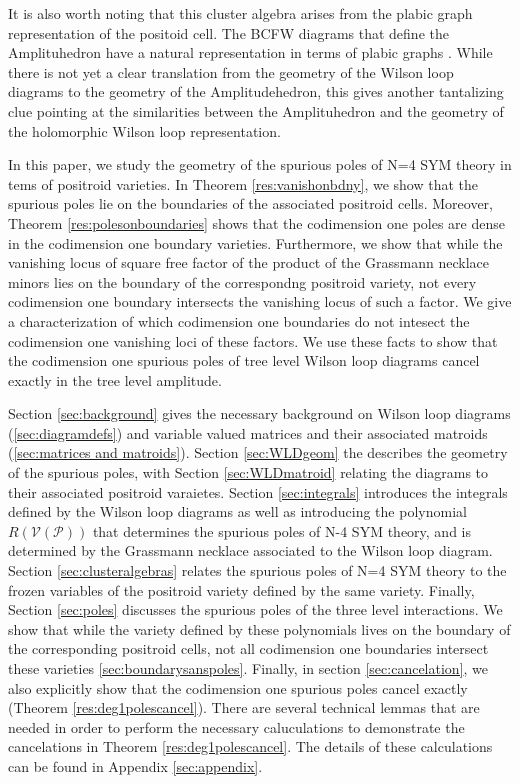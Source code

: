 \documentclass[11pt]{article}
\newcommand{\cP}{\mathcal{P}}
\newcommand{\cV}{\mathcal{V}}
\newcommand{\VP}{\cV(\cP)}
\theoremstyle{remark}
\theoremstyle{definition}
\begin{document}
It is also worth noting that this cluster algebra arises from the plabic graph representation of the positoid cell. The BCFW diagrams that define the Amplituhedron have a natural representation in terms of plabic graphs \cite[Section 5]{AmplituhedronDecomposition}. While there is not yet a clear translation from the geometry of the Wilson loop diagrams to the geometry of the Amplitudehedron, this gives another tantalizing clue pointing at the similarities between the Amplituhedron and the geometry of the holomorphic Wilson loop representation. 

In this paper, we study the geometry of the spurious poles of N=4 SYM theory in tems of positroid varieties. In Theorem \ref{res:vanishonbdny}, we show that the spurious poles lie on the boundaries of the associated positroid cells. Moreover, Theorem \ref{res:polesonboundaries} shows that  the codimension one poles are dense in the codimension one boundary varieties. Furthermore, we show that while the vanishing locus of square free factor of the product of the Grassmann necklace minors lies on the boundary of the correspondng positroid variety, not every codimension one boundary intersects the vanishing locus of such a factor. We give a characterization of which codimension one boundaries do not intesect the codimension one vanishing loci of these factors. We use these facts to show that the codimension one spurious poles of tree level Wilson loop diagrams cancel exactly in the tree level amplitude. 

Section \ref{sec:background} gives the necessary background on Wilson loop diagrams (\ref{sec:diagramdefs}) and variable valued matrices and their associated matroids (\ref{sec:matrices and matroids}). Section \ref{sec:WLDgeom} the describes the geometry of the spurious poles, with Section \ref{sec:WLDmatroid} relating the diagrams to their associated positroid varaietes. Section \ref{sec:integrals} introduces the integrals defined by the Wilson loop diagrams as well as introducing the polynomial $R(\VP)$ that determines the spurious poles of N-4 SYM theory, and is determined by the Grassmann necklace associated to the Wilson loop diagram. Section \ref{sec:clusteralgebras} relates the spurious poles of N=4 SYM theory to the frozen variables of the positroid variety defined by the same variety. Finally, Section \ref{sec:poles} discusses the spurious poles of the three level interactions. We show that while the variety defined by these polynomials lives on the boundary of the corresponding positroid cells, not all codimension one boundaries intersect these varieties \ref{sec:boundarysanspoles}. Finally, in section \ref{sec:cancelation}, we also explicitly show that the codimension one spurious poles cancel exactly (Theorem \ref{res:deg1polescancel}). There are several technical lemmas that are needed in order to perform the necessary caluculations to demonstrate the cancelations in  Theorem \ref{res:deg1polescancel}. The details of these calculations can be found in Appendix \ref{sec:appendix}.
 
\end{document}
